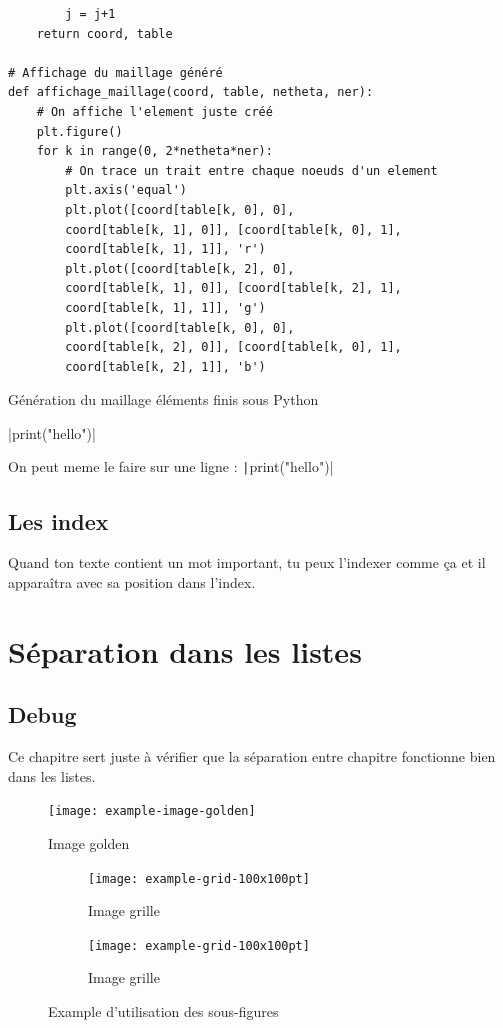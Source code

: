 \documentclass[a4paper,11pt]{report}    %
\newenvironment{longlisting}{\captionsetup{type=listing}}{} %
\begin{document}
\begin{longlisting}
\begin{verbatim}
        j = j+1
    return coord, table

# Affichage du maillage généré
def affichage_maillage(coord, table, netheta, ner):
    # On affiche l'element juste créé
    plt.figure()
    for k in range(0, 2*netheta*ner):
        # On trace un trait entre chaque noeuds d'un element
        plt.axis('equal')
        plt.plot([coord[table[k, 0], 0],
        coord[table[k, 1], 0]], [coord[table[k, 0], 1],
        coord[table[k, 1], 1]], 'r')
        plt.plot([coord[table[k, 2], 0],
        coord[table[k, 1], 0]], [coord[table[k, 2], 1],
        coord[table[k, 1], 1]], 'g')
        plt.plot([coord[table[k, 0], 0],
        coord[table[k, 2], 0]], [coord[table[k, 0], 1],
        coord[table[k, 2], 1]], 'b')
\end{verbatim}
\caption{Génération du maillage éléments finis sous Python}
\label{lst:PT_Mesh.py}
\end{longlisting}

|print("hello")| %

On peut meme le faire sur une ligne : \texttt|print("hello")|   %

\section{Les index}

Quand ton texte contient un mot important, tu peux l'indexer comme ça et il apparaîtra avec sa position dans l'index.

\chapter{Séparation dans les listes}

\section{Debug}

Ce chapitre sert juste à vérifier que la séparation entre chapitre fonctionne bien dans les listes.

\begin{figure}[H]
    \centering
    \texttt{[image: example-image-golden]}
    \caption{Image golden}
    \label{fig:example-image-golden}
\end{figure}

\begin{figure}[H]
    \begin{subfigure}[t]{0.475\textwidth}
        \texttt{[image: example-grid-100x100pt]}
        \caption{Image grille}
        \label{subfig:example-grid}
    \end{subfigure}%
    \hfill
    \begin{subfigure}[t]{0.475\textwidth}
        \texttt{[image: example-grid-100x100pt]}
        \caption{Image grille}
        \label{subfig:example-grid_bis}
    \end{subfigure}
    \caption{Example d'utilisation des sous-figures}
    \label{fig:test_subfigure_bis}
\end{figure}
\end{document}
